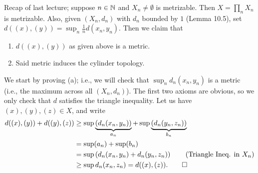 \noindent Recap of last lecture; suppose $n \in \mathbb N$ and $X_n \neq \emptyset$ is metrizable. Then $X = \prod_n X_n$ is metrizable. Also, given $(X_n, d_n)$ with $d_n$ bounded by $1$ (Lemma 10.5), set $d((x), (y)) = \sup_n \frac{1}{n} d(x_n, y_n)$. Then we claim that
\begin{enumerate}[label=(\alph*)]
    \item $d((x), (y))$ as given above is a metric.
    \item Said metric induces the cylinder topology.
\end{enumerate}
We start by proving (a); i.e., we will check that $\sup_n d_n(x_n, y_n)$ is a metric (i.e., the maximum across all $(X_n, d_n)$). The first two axioms are obvious, so we only check that $d$ satisfies the triangle inequality. Let us have $(x), (y), (z) \in X$, and write
\begin{align*}
    d((x), (y)) + d((y), (z)) &\geq \sup \underbrace{\left(d_n(x_n, y_n)\right)}_{a_n} + \sup \underbrace{\left(d_n(y_n, z_n)\right)}_{b_n} \\
    &= \sup(a_n) + \sup(b_n) \\
    &= \sup \left(d_n(x_n, y_n) + d_n(y_n, z_n)\right) \tag{Triangle Ineq. in $X_n$} \\
    &\geq \sup d_n(x_n, z_n) = d((x), (z)). \qed
\end{align*}

